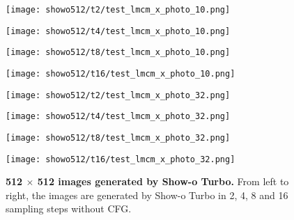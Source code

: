 \begin{figure*}[htbp]
    \begin{minipage}{0.21\textwidth}
        \texttt{[image: showo512/t2/test\_lmcm\_x\_photo\_10.png]}
    \end{minipage}\hspace{0.1cm}%
    \begin{minipage}{0.21\textwidth}
        \texttt{[image: showo512/t4/test\_lmcm\_x\_photo\_10.png]}
    \end{minipage}\hspace{0.1cm}%
    \begin{minipage}{0.21\textwidth}
        \texttt{[image: showo512/t8/test\_lmcm\_x\_photo\_10.png]}
    \end{minipage}\hspace{0.1cm}%
    \begin{minipage}{0.21\textwidth}
        \texttt{[image: showo512/t16/test\_lmcm\_x\_photo\_10.png]}
    \end{minipage}\hspace{0.1cm}%

    \vspace{-0.1cm}

    \begin{minipage}{0.21\textwidth}
        \texttt{[image: showo512/t2/test\_lmcm\_x\_photo\_32.png]}
    \end{minipage}\hspace{0.1cm}%
    \begin{minipage}{0.21\textwidth}
        \texttt{[image: showo512/t4/test\_lmcm\_x\_photo\_32.png]}
    \end{minipage}\hspace{0.1cm}%
    \begin{minipage}{0.21\textwidth}
        \texttt{[image: showo512/t8/test\_lmcm\_x\_photo\_32.png]}
    \end{minipage}\hspace{0.1cm}%
    \begin{minipage}{0.21\textwidth}
        \texttt{[image: showo512/t16/test\_lmcm\_x\_photo\_32.png]}
    \end{minipage}\hspace{0.1cm}%
    \vspace{-0.1cm}

    \caption{\small \textbf{512 $\times$ 512 images generated by Show-o Turbo.} From left to right, the images are generated by Show-o Turbo in 2, 4, 8 and 16 sampling steps without CFG.}
    \label{fig:512display}
\end{figure*}


